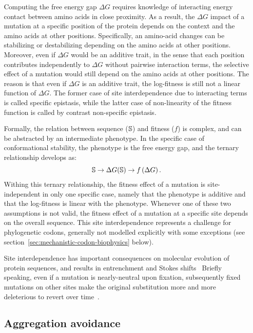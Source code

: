 Computing the free energy gap $\Delta G$ requires knowledge of interacting energy contact between amino acids in close proximity.
As a result, the $\Delta G$ impact of a mutation at a specific position of the protein depends on the context and the amino acids at other positions.
Specifically, an amino-acid changes can be stabilizing or destabilizing depending on the amino acids at other positions.
Moreover, even if $\Delta G$ would be an additive trait, in the sense that each position contributes independently to $\Delta G$ without pairwise interaction terms, the selective effect of a mutation would still depend on the amino acids at other positions.
The reason is that even if $\Delta G$ is an additive trait, the log-fitness is still not a linear function of $\Delta G$.
The former case of site interdependence due to interacting terms is called specific epistasis, while the latter case of non-linearity of the fitness function is called by contrast non-specific epistasis.

Formally, the relation between sequence ($\mathbb{S}$) and fitness ($f$) is complex, and can be abstracted by an intermediate phenotype.
In the specific case of conformational stability, the phenotype is the free energy gap, and the ternary relationship develops as:
\begin{equation}
    \mathbb{S} \rightarrow \Delta G (\mathbb{S}) \rightarrow f \left( \Delta G \right).
\end{equation}
Withing this ternary relationship, the fitness effect of a mutation is site-independent in only one specific case, namely that the phenotype is additive and that the log-fitness is linear with the phenotype.
Whenever one of these two assumptions is not valid, the fitness effect of a mutation at a specific site depends on the overall sequence.
This site interdependence represents a challenge for phylogenetic codons, generally not modelled explicitly with some exceptions (see section~\ref{sec:mechanistic-codon-biophysics} below).

Site interdependence has important consequences on molecular evolution  of protein sequences, and results in entrenchment and Stokes shifts~\citep{Pollock2012, Shah2015}
Briefly speaking, even if a mutation is nearly-neutral upon fixation, subsequently fixed mutations on other sites make the original substitution more and more deleterious to revert over time~\citep{Lunzer2010, Naumenko2012, Mccandlish2013}.

\subsection{Aggregation avoidance}

